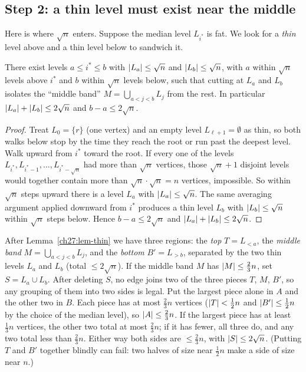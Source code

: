 \subsection{Step 2: a thin level must exist near the middle}

Here is where $\sqrt n$ enters. Suppose the median level $L_{i^*}$ is fat. We look for a \emph{thin} level above and a thin level below to sandwich it.

\begin{lemma}\label{ch27:lem-thin}
There exist levels $a\le i^*\le b$ with $\lvert L_a\rvert\le \sqrt n$ and $\lvert L_b\rvert\le \sqrt n$, with $a$ within $\sqrt n$ levels above $i^*$ and $b$ within $\sqrt n$ levels below, such that cutting at $L_a$ and $L_b$ isolates the ``middle band'' $M=\bigcup_{a<j<b}L_j$ from the rest. In particular $\lvert L_a\rvert+\lvert L_b\rvert\le 2\sqrt n$ and $b-a\le 2\sqrt n$.
\end{lemma}

\begin{proof}
Treat $L_0=\{r\}$ (one vertex) and an empty level $L_{\ell+1}=\emptyset$ as thin, so both walks below stop by the time they reach the root or run past the deepest level. Walk upward from $i^*$ toward the root. If every one of the levels $L_{i^*}, L_{i^*-1},\dots, L_{i^*-\sqrt n}$ had more than $\sqrt n$ vertices, those $\sqrt n+1$ disjoint levels would together contain more than $\sqrt n\cdot\sqrt n=n$ vertices, impossible. So within $\sqrt n$ steps upward there is a level $L_a$ with $\lvert L_a\rvert\le\sqrt n$. The same averaging argument applied downward from $i^*$ produces a thin level $L_b$ with $\lvert L_b\rvert\le\sqrt n$ within $\sqrt n$ steps below. Hence $b-a\le 2\sqrt n$ and $\lvert L_a\rvert+\lvert L_b\rvert\le 2\sqrt n$.
\end{proof}

After Lemma~\ref{ch27:lem-thin} we have three regions: the \emph{top} $T=L_{<a}$, the \emph{middle band} $M=\bigcup_{a<j<b}L_j$, and the \emph{bottom} $B'=L_{>b}$, separated by the two thin levels $L_a$ and $L_b$ (total $\le 2\sqrt n$). If the middle band $M$ has $\lvert M\rvert\le \tfrac23 n$, set $S=L_a\cup L_b$. After deleting $S$, no edge joins two of the three pieces $T$, $M$, $B'$, so any grouping of them into two sides is legal. Put the largest piece alone in $A$ and the other two in $B$. Each piece has at most $\tfrac23 n$ vertices ($\lvert T\rvert<\tfrac12 n$ and $\lvert B'\rvert\le\tfrac12 n$ by the choice of the median level), so $\lvert A\rvert\le\tfrac23 n$. If the largest piece has at least $\tfrac13 n$ vertices, the other two total at most $\tfrac23 n$; if it has fewer, all three do, and any two total less than $\tfrac23 n$. Either way both sides are $\le\tfrac23 n$, with $\lvert S\rvert\le 2\sqrt n$. (Putting $T$ and $B'$ together blindly can fail: two halves of size near $\tfrac12 n$ make a side of size near $n$.)

